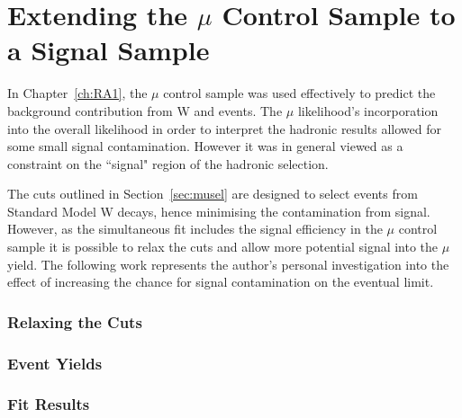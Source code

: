 \chapter{Extending the $\mu$ Control Sample to a Signal Sample}

In Chapter~\ref{ch:RA1}, the $\mu$ control sample was used effectively to predict the background contribution from W and \tto events. The $\mu$ likelihood's incorporation into the overall likelihood in order to interpret the hadronic results allowed for some small signal contamination. However it was in general viewed as a constraint on the ``signal" region of the hadronic selection. 

The cuts outlined in Section~\ref{sec:musel} are designed to select events from Standard Model W decays, hence minimising the contamination from signal. However, as the simultaneous fit includes the signal efficiency in the $\mu$ control sample it is possible to relax the cuts and allow more potential signal into the $\mu$ yield. The following work represents the author's personal investigation into the effect of increasing the chance for signal contamination on the eventual limit. 

\subsection{Relaxing the Cuts}



\subsection{Event Yields}
\subsection{Fit Results}

